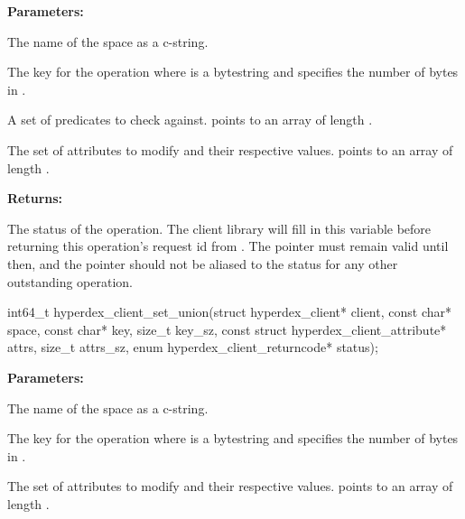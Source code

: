\noindent\textbf{Parameters:}
\begin{description}[labelindent=\widthof{{\code{checks}, \code{checks\_sz}}},leftmargin=*,noitemsep,nolistsep,align=right]
\item[\code{space}] The name of the space as a c-string.
\item[\code{key}, \code{key\_sz}] The key for the operation where  is a bytestring and  specifies the number of bytes in .
\item[\code{checks}, \code{checks\_sz}] A set of predicates to check against.   points to an array of length .
\item[\code{attrs}, \code{attrs\_sz}] The set of attributes to modify and their respective values.   points to an array of length .
\end{description}

\noindent\textbf{Returns:}
\begin{description}[labelindent=\widthof{{\code{status}}},leftmargin=*,noitemsep,nolistsep,align=right]
\item[\code{status}] The status of the operation.  The client library will fill in this variable before returning this operation's request id from .  The pointer must remain valid until then, and the pointer should not be aliased to the status for any other outstanding operation.
\end{description}

\funcsep
{}
\begin{ccode}
int64_t hyperdex_client_set_union(struct hyperdex_client* client,
                const char* space,
                const char* key, size_t key_sz,
                const struct hyperdex_client_attribute* attrs, size_t attrs_sz,
                enum hyperdex_client_returncode* status);
\end{ccode}
\funcdesc 

\noindent\textbf{Parameters:}
\begin{description}[labelindent=\widthof{{\code{attrs}, \code{attrs\_sz}}},leftmargin=*,noitemsep,nolistsep,align=right]
\item[\code{space}] The name of the space as a c-string.
\item[\code{key}, \code{key\_sz}] The key for the operation where  is a bytestring and  specifies the number of bytes in .
\item[\code{attrs}, \code{attrs\_sz}] The set of attributes to modify and their respective values.   points to an array of length .
\end{description}

